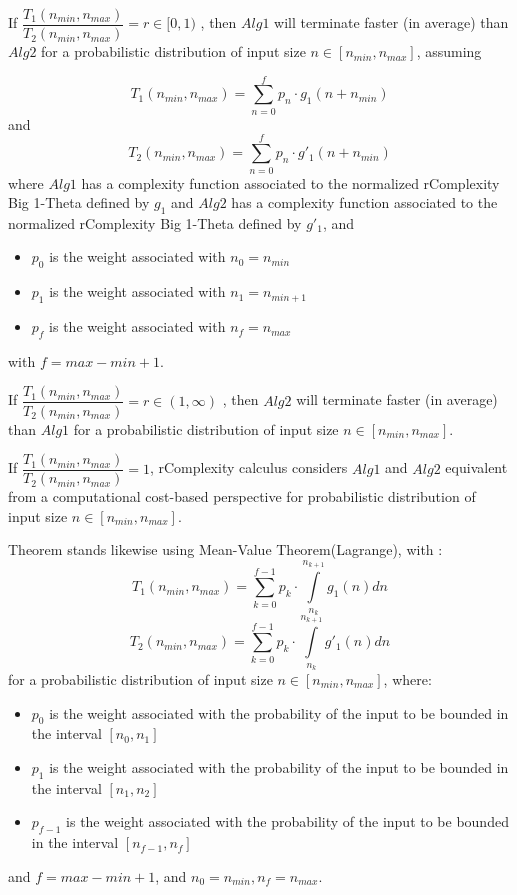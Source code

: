 \begin{theorem}
If $ \dfrac{T_{1}(n_{min}, n_{max})}{T_{2}(n_{min}, n_{max})} = r \in [0,1) $ , then $Alg1$ will terminate faster (in average) than $Alg2$ for a probabilistic distribution of input size $n \in [n_{min}, n_{max}]$,  assuming


 \[T_{1}(n_{min}, n_{max}) = \sum\limits_{n=0}^{f} p_{n} \cdot g_{1}(n + n_{min})\] and \[T_{2}(n_{min}, n_{max}) = \sum\limits_{n=0}^{f} p_{n} \cdot g'_{1}(n + n_{min})\] where $Alg1$ has a complexity function associated to the normalized rComplexity Big 1-Theta defined by $g_{1}$ and $Alg2$ has a complexity function associated to the normalized rComplexity Big 1-Theta defined by $g'_{1}$, and

\begin{itemize}
	\item $p_{0}$ is the weight associated with $n_{0} = n_{min}$
	\item $p_{1}$ is the weight associated with $n_{1} = n_{min + 1}$
	\item $p_{f}$ is the weight associated with $n_{f} = n_{max}$
\end{itemize}
with $f = max - min + 1$.

\end{theorem}

\begin{corollary}
If $ \dfrac{T_{1}(n_{min}, n_{max})}{T_{2}(n_{min}, n_{max})} = r \in (1,\infty) $ , then $Alg2$ will terminate faster (in average) than $Alg1$ for a probabilistic distribution of input size $n \in [n_{min}, n_{max}]$.
\end{corollary}

\begin{remark}
If  $ \dfrac{T_{1}(n_{min}, n_{max})}{T_{2}(n_{min}, n_{max})} = 1$, rComplexity calculus considers $Alg1$ and $Alg2$ equivalent from a computational cost-based perspective for probabilistic distribution of input size $n \in [n_{min}, n_{max}]$.
\end{remark}

\begin{remark}
Theorem stands likewise using Mean-Value Theorem(Lagrange), with :
\[  T_{1}(n_{min}, n_{max}) =\sum\limits_{k=0}^{f-1} p_{k} \cdot \int\limits_{n_{k}}^{n_{k+1}} g_{1}(n) dn  \]
\[  T_{2}(n_{min}, n_{max}) =\sum\limits_{k=0}^{f-1} p_{k} \cdot \int\limits_{n_{k}}^{n_{k+1}} g'_{1}(n) dn  \]
for a probabilistic distribution of input size $n \in [n_{min}, n_{max}]$, where:
\begin{itemize}
	\item $p_{0}$ is the weight associated with the probability of the input to be bounded in the interval $[n_{0}, n_{1}]$
	\item $p_{1}$ is the weight associated with the probability of the input to be bounded in the interval $[n_{1}, n_{2}]$
	\item $p_{f-1}$ is the weight associated with the probability of the input to be bounded in the interval $[n_{f-1}, n_{f}]$
\end{itemize}
and $f = max - min + 1$, and $n_{0} = n_{min}, n_{f} = n_{max}$.

\end{remark}